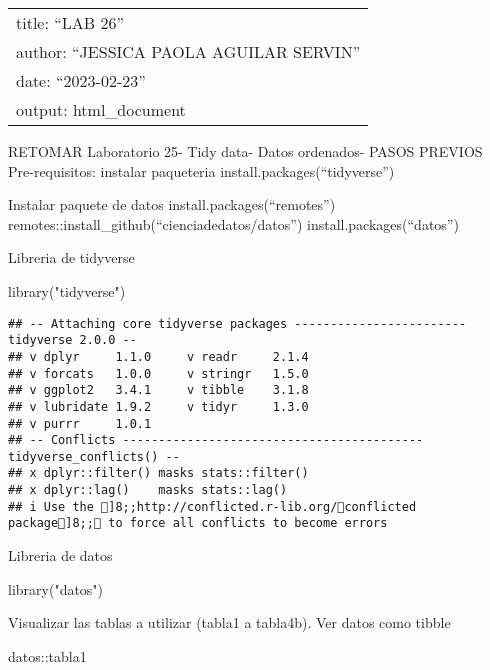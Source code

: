 \documentclass[
]{article}
\author{}
\date{\vspace{-2.5em}}
\newenvironment{Shaded}{\begin{snugshade}}{\end{snugshade}}
\newcommand{\FunctionTok}[1]{\textcolor[rgb]{0.00,0.00,0.00}{#1}}
\newcommand{\NormalTok}[1]{#1}
\newcommand{\SpecialCharTok}[1]{\textcolor[rgb]{0.00,0.00,0.00}{#1}}
\newcommand{\StringTok}[1]{\textcolor[rgb]{0.31,0.60,0.02}{#1}}
\begin{document}
\begin{longtable}[]{@{}l@{}}
\toprule()
\endhead
title: ``LAB 26'' \\
author: ``JESSICA PAOLA AGUILAR SERVIN'' \\
date: ``2023-02-23'' \\
output: html\_document \\
\bottomrule()
\end{longtable}

RETOMAR Laboratorio 25- Tidy data- Datos ordenados- PASOS PREVIOS
Pre-requisitos: instalar paqueteria install.packages(``tidyverse'')

Instalar paquete de datos install.packages(``remotes'')
remotes::install\_github(``cienciadedatos/datos'')
install.packages(``datos'')

Libreria de tidyverse

\begin{Shaded}
\begin{Highlighting}[]
\FunctionTok{library}\NormalTok{(}\StringTok{"tidyverse"}\NormalTok{)}
\end{Highlighting}
\end{Shaded}

\begin{verbatim}
## -- Attaching core tidyverse packages ------------------------ tidyverse 2.0.0 --
## v dplyr     1.1.0     v readr     2.1.4
## v forcats   1.0.0     v stringr   1.5.0
## v ggplot2   3.4.1     v tibble    3.1.8
## v lubridate 1.9.2     v tidyr     1.3.0
## v purrr     1.0.1     
## -- Conflicts ------------------------------------------ tidyverse_conflicts() --
## x dplyr::filter() masks stats::filter()
## x dplyr::lag()    masks stats::lag()
## i Use the ]8;;http://conflicted.r-lib.org/conflicted package]8;; to force all conflicts to become errors
\end{verbatim}

Libreria de datos

\begin{Shaded}
\begin{Highlighting}[]
\FunctionTok{library}\NormalTok{(}\StringTok{"datos"}\NormalTok{)}
\end{Highlighting}
\end{Shaded}

Visualizar las tablas a utilizar (tabla1 a tabla4b). Ver datos como
tibble

\begin{Shaded}
\begin{Highlighting}[]
\NormalTok{datos}\SpecialCharTok{::}\NormalTok{tabla1}
\end{Highlighting}
\end{Shaded}
\end{document}
